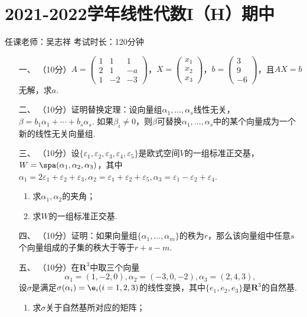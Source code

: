 \section*{2021-2022学年线性代数I（H）期中}

\begin{center}
    任课老师：吴志祥\hspace{4em} 考试时长：120分钟
\end{center}
\begin{enumerate}
	\item[一、]（10分）$A=\begin{pmatrix}
        1 & 1 & 1 \\ 2 & 1 & -a \\ 1 & -2 & -3
    \end{pmatrix}$，$X=\begin{pmatrix}
        x_1 \\ x_2 \\ x_3
    \end{pmatrix}$，$b=\begin{pmatrix}
        3 \\ 9 \\ -6
    \end{pmatrix}$，且$AX=b$无解，求$a$.
	\item[二、]（10分）证明替换定理：设向量组$\alpha_1,\ldots,\alpha_s$线性无关，$\beta=b_1\alpha_1+\cdots+b_s\alpha_s$. 如果$\beta_i\neq 0$，则$\beta$可替换$\alpha_1,\ldots,\alpha_s$中的某个向量成为一个新的线性无关向量组.
	\item[三、]（10分）设$\{\varepsilon_1,\varepsilon_2,\varepsilon_3,\varepsilon_4,\varepsilon_5\}$是欧式空间$V$的一组标准正交基，$W=\spa(\alpha_1,\alpha_2,\alpha_3)$，其中$\alpha_1=2\varepsilon_1+\varepsilon_2+\varepsilon_3,\alpha_2=\varepsilon_1+\varepsilon_2+\varepsilon_5,\alpha_3=\varepsilon_1-\varepsilon_2+\varepsilon_4$.
	\begin{enumerate}[label=(\arabic*)]
        \item 求$\alpha_1,\alpha_2$的夹角；

        \item 求$W$的一组标准正交基.
    \end{enumerate}
	\item[四、]（10分）证明：如果向量组$\{\alpha_1,\ldots,\alpha_m\}$的秩为$r$，那么该向量组中任意$s$个向量组成的子集的秩大于等于$r+s-m$.
	\item[五、]（10分）在$\mathbf{R}^3$中取三个向量
	\[\alpha_1=(1,-2,0),\alpha_2=(-3,0,-2),\alpha_3=(2,4,3),\]
    设$\sigma$是满足$\sigma(\alpha_i)=\e_i(i=1,2,3)$的线性变换，其中$\{e_1,e_2,e_3\}$是$\mathbf{R}^3$的自然基.
    \begin{enumerate}[label=(\arabic*)]
        \item 求$\sigma$关于自然基所对应的矩阵；


\end{enumerate}
\end{enumerate}
